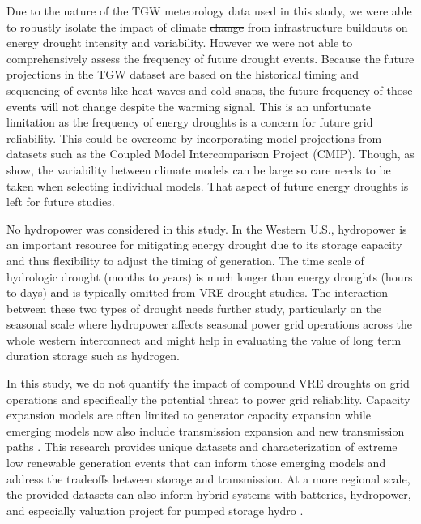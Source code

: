 \documentclass{agujournal2019}
\providecommand{\DIFdel}[1]{{\protect\color{red}\sout{#1}}} %
\providecommand{\DIFdelbegin}{} %
\providecommand{\DIFdelend}{} %
\begin{document}
Due to the nature of the TGW meteorology data used in this study, we were able to robustly isolate the impact of climate \DIFdelbegin \DIFdel{change }\DIFdelend from infrastructure buildouts on energy drought intensity and variability. However we were not able to comprehensively assess the frequency of future drought events. Because the future projections in the TGW dataset are based on the historical timing and sequencing of events like heat waves and cold snaps, the future frequency of those events will not change despite the warming signal. This is an unfortunate limitation as the frequency of energy droughts is a concern for future grid reliability. This could be overcome by incorporating model projections from datasets such as the Coupled Model Intercomparison Project (CMIP). Though, as  show, the variability between climate models can be large so care needs to be taken when selecting individual models. That aspect of future energy droughts is left for future studies.

No hydropower was considered in this study. In the Western U.S., hydropower is an important resource for mitigating energy drought due to its storage capacity and thus flexibility to adjust the timing of generation. The time scale of hydrologic drought (months to years) is much longer than energy droughts (hours to days) and is typically omitted from VRE drought studies. The interaction between these two types of drought needs further study, particularly on the seasonal scale where hydropower affects seasonal power grid operations across the whole western interconnect \cite{Voisin_2018,Hill_2021} and might help in evaluating the value of long term duration storage such as hydrogen.

In this study, we do not quantify the impact of compound VRE droughts on grid operations and specifically the potential threat to power grid reliability. Capacity expansion models are often limited to generator capacity expansion while emerging models now also include transmission expansion and new transmission paths \cite{Gonzalez_Romero_2020}. This research provides unique datasets and characterization of extreme low renewable generation events that can inform those emerging models and address the tradeoffs between storage and transmission. At a more regional scale, the provided datasets can also inform hybrid systems with batteries, hydropower, and especially valuation project for pumped storage hydro \cite{Francois2016}. 
\end{document}
